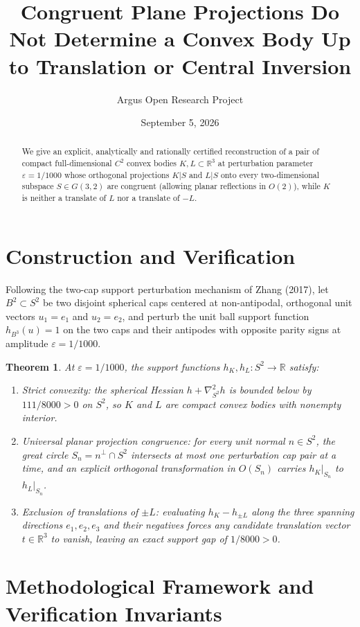 \documentclass[10pt,reqno]{amsart}
\title[Congruent Plane Projections of Convex Bodies in $\mathbb{R}^3$]
{Congruent Plane Projections Do Not Determine a Convex Body Up to Translation or Central Inversion}
\author{Argus Open Research Project}
\date{September 5, 2026}
\newtheorem{theorem}{Theorem}[section]
\theoremstyle{definition}
\begin{document}
\begin{abstract}
We give an explicit, analytically and rationally certified reconstruction of a pair of compact full-dimensional $C^2$ convex bodies $K,L\subset\mathbb{R}^3$ at perturbation parameter $\varepsilon=1/1000$ whose orthogonal projections $K|S$ and $L|S$ onto every two-dimensional subspace $S\in G(3,2)$ are congruent (allowing planar reflections in $O(2)$), while $K$ is neither a translate of $L$ nor a translate of $-L$.
\end{abstract}
\maketitle
\section{Construction and Verification}
Following the two-cap support perturbation mechanism of Zhang (2017), let $B^2\subset S^2$ be two disjoint spherical caps centered at non-antipodal, orthogonal unit vectors $u_1=e_1$ and $u_2=e_2$, and perturb the unit ball support function $h_{B^3}(u)=1$ on the two caps and their antipodes with opposite parity signs at amplitude $\varepsilon=1/1000$.
\begin{theorem}
At $\varepsilon=1/1000$, the support functions $h_K, h_L : S^2\to\mathbb{R}$ satisfy:
\begin{enumerate}[label=\textup{(\arabic*)}]
  \item \emph{Strict convexity:} the spherical Hessian $h+\nabla^2_{S^2}h$ is bounded below by $111/8000 > 0$ on $S^2$, so $K$ and $L$ are compact convex bodies with nonempty interior.
  \item \emph{Universal planar projection congruence:} for every unit normal $n\in S^2$, the great circle $S_n=n^\perp\cap S^2$ intersects at most one perturbation cap pair at a time, and an explicit orthogonal transformation in $O(S_n)$ carries $h_K|_{S_n}$ to $h_L|_{S_n}$.
  \item \emph{Exclusion of translations of $\pm L$:} evaluating $h_K-h_{\pm L}$ along the three spanning directions $e_1,e_2,e_3$ and their negatives forces any candidate translation vector $t\in\mathbb{R}^3$ to vanish, leaving an exact support gap of $1/8000 > 0$.
\end{enumerate}
\end{theorem}

\section{Methodological Framework and Verification Invariants}
\end{document}

